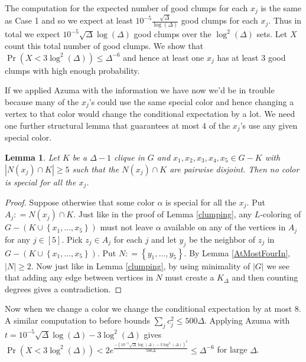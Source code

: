 \documentclass[12pt]{article}
\theoremstyle{plain}
\newtheorem{lem}[thm]{Lemma}
\theoremstyle{definition}
\theoremstyle{remark}
\newcommand{\set}[1]{\left\{ #1 \right\}}
\newcommand{\card}[1]{\left|#1\right|}
\newcommand{\irange}[1]{\left[#1\right]}
\newcommand{\DefinedAs}{\mathrel{\mathop:}=}
\begin{document}
The computation for the expected number of good clumps for each $x_j$ is the
same as Case 1 and so we expect at least
$10^{-5}\frac{\sqrt{\Delta}}{\log(\Delta)}$ good clumps for each $x_j$.  Thus in
total we expect $10^{-5}\sqrt{\Delta}\log(\Delta)$ good clumps over the
$\log^2(\Delta)$ sets.  Let $X$ count this total number of good clumps.  We show
that $\Pr(X < 3\log^2(\Delta)) \leq \Delta^{-6}$ and hence at least one $x_j$
has at least $3$ good clumps with high enough probability.

If we applied Azuma with the information we have now we'd be in trouble because
many of the $x_j$'s could use the same special color and hence changing a vertex
to that color would change the conditional expectation by a lot.  We need one
further structural lemma that guarantees at most $4$ of the $x_j$'s use any
given special color.

\begin{lem}\label{LastStructure}
Let $K$ be a $\Delta-1$ clique in $G$ and $x_1, x_2, x_3, x_4, x_5 \in G - K$
with $\card{N(x_j) \cap K} \geq 5$ such that the $N(x_j) \cap K$ are pairwise
disjoint. Then no color is special for all the $x_j$.
\end{lem}
\begin{proof}
Suppose otherwise that some color $\alpha$ is special for all the $x_j$. Put
$A_j \DefinedAs N(x_j) \cap K$. Just like in the proof of Lemma \ref{clumping},
any $L$-coloring of $G - (K \cup \set{x_1, \ldots, x_5})$ must not leave
$\alpha$ available on any of the vertices in $A_j$ for any $j \in \irange{5}$.
Pick $z_j \in A_j$ for each $j$ and let $y_j$ be the neighbor of $z_j$ in $G -
(K \cup \set{x_1, \ldots, x_5})$. Put $N \DefinedAs \set{y_1, \ldots, y_5}$. By
Lemma \ref{AtMostFourIn}, $\card{N} \geq 2$.  Now just like in Lemma
\ref{clumping}, by using minimality of $\card{G}$ we see that adding any edge
between vertices in $N$ must create a $K_\Delta$ and then counting degrees gives
a contradiction.
\end{proof}

Now when we change a color we change the conditional expectation by at most $8$.
A similar computation to before bounds $\sum_j c_j^2 \leq 500\Delta$.  Applying
Azuma with $t = 10^{-5}\sqrt{\Delta}\log(\Delta) - 3\log^2(\Delta)$ gives $\Pr(X
< 3\log^2(\Delta)) < 2e^{\frac{-(10^{-5}\sqrt{\Delta}\log(\Delta) -
3\log^2(\Delta))^2}{500\Delta}} \leq \Delta^{-6}$ for large $\Delta$.
\end{document}
